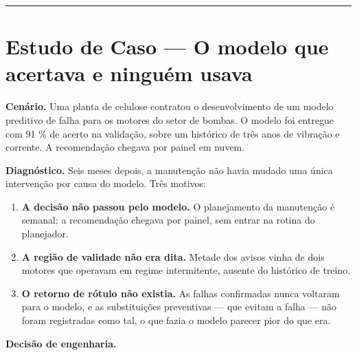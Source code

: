 \begin{center}\rule{0.5\linewidth}{0.5pt}\end{center}

\section{\texorpdfstring{Estudo de Caso --- O modelo que acertava e ninguém usava}{Estudo de Caso  O modelo que acertava e ninguém usava}}\label{estudo-de-caso-o-modelo-que-acertava-e-ninguuxe9m-usava}

\textbf{Cenário.} Uma planta de celulose contratou o desenvolvimento de um modelo preditivo de falha para
os motores do setor de bombas. O modelo foi entregue com 91 \% de acerto na validação, sobre um
histórico de três anos de vibração e corrente. A recomendação chegava por painel em nuvem.

\textbf{Diagnóstico.} Seis meses depois, a manutenção não havia mudado uma única intervenção por causa do
modelo. Três motivos:

\begin{enumerate}
\def\labelenumi{\arabic{enumi}.}
\tightlist
\item
  \textbf{A decisão não passou pelo modelo.} O planejamento da manutenção é semanal; a recomendação
  chegava por painel, sem entrar na rotina do planejador.
\item
  \textbf{A região de validade não era dita.} Metade dos avisos vinha de dois motores que operavam em
  regime intermitente, ausente do histórico de treino.
\item
  \textbf{O retorno de rótulo não existia.} As falhas confirmadas nunca voltaram para o modelo, e as
  substituições preventivas --- que evitam a falha --- não foram registradas como tal, o que fazia o
  modelo parecer pior do que era.
\end{enumerate}

\textbf{Decisão de engenharia.}

